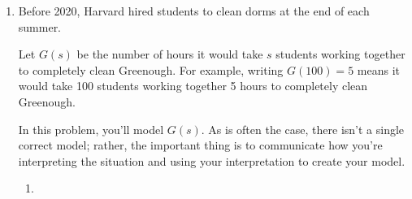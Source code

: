 \documentclass{article}
\begin{document}
\begin{enumerate}
\begin{enumerate}
  \item

    \begin{grading}
      1 point, 0.5 for identifying that it's linear and 0.5 for identifying that this is because Akiko runs at a constant speed.
    \end{grading}

    \begin{problem}[1in]
      Is $A(t)$ linear, concave up, or concave down? Explain why in terms of the rate that Akiko runs.
    \end{problem}

    \begin{solution}
      Since Akiko runs at a constant speed, $A$ is linear. 
    \end{solution}

  \item

    \begin{grading}
      1 point, graded for consistency with whatever they drew in their graph.
    \end{grading}

    \begin{problem}[\nstretch{0.25}]
      Is $B(t)$ linear, concave up, or concave down? No explanation is necessary.
    \end{problem}

    \begin{solution}
      $B$ is concave up. 
    \end{solution}

  \end{enumerate}

\item \label{cleaning-greenough} 

  Before 2020, Harvard hired students to clean dorms at the end of each summer.

  Let $G(s)$ be the number of hours it would take $s$ students working together to completely clean Greenough. For example, writing $G(100) = 5$ means it would take 100 students working together 5 hours to completely clean Greenough.

  In this problem, you'll model $G(s)$. As is often the case, there isn't a single correct model; rather, the important thing is to communicate how you're interpreting the situation and using your interpretation to create your model.

  \begin{enumerate}
  \item


\end{enumerate}
\end{enumerate}
\end{document}
